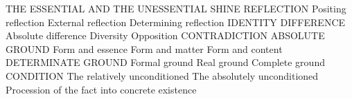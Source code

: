 THE ESSENTIAL AND THE UNESSENTIAL
SHINE
REFLECTION
Positing reflection
External reflection
Determining reflection
IDENTITY
DIFFERENCE
Absolute difference
Diversity
Opposition
CONTRADICTION
ABSOLUTE GROUND
Form and essence
Form and matter
Form and content
DETERMINATE GROUND
Formal ground
Real ground
Complete ground
CONDITION
The relatively unconditioned
The absolutely unconditioned
Procession of the fact into concrete existence
